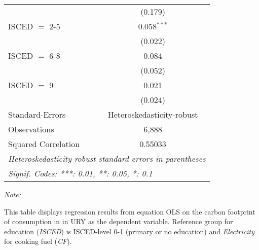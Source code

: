 \begin{table}[htbp!]
\begin{adjustbox}{width = 1\textwidth, max height = 0.95\textheight, center}
\begin{threeparttable}[b]
\begin{tabular}{lc}
                                & (0.179)\\   
            ISCED $=$ 2-5       & 0.058$^{***}$\\   
                                & (0.022)\\   
            ISCED $=$ 6-8       & 0.084\\   
                                & (0.052)\\   
            ISCED $=$ 9         & 0.021\\   
                                & (0.024)\\   
            \midrule 
            Standard-Errors     & Heteroskedasticity-robust \\   
            Observations        & 6,888\\  
            Squared Correlation & 0.55033\\  
            \midrule \midrule
            \multicolumn{2}{l}{\emph{Heteroskedasticity-robust standard-errors in parentheses}}\\
            \multicolumn{2}{l}{\emph{Signif. Codes: ***: 0.01, **: 0.05, *: 0.1}}\\
         \end{tabular}
         
         \begin{tablenotes}\item \medskip \textit{Note:}
            \item This table displays regression results from equation OLS on the carbon footprint of consumption in  in URY as the dependent variable.  Reference group for education (\textit{ISCED}) is ISCED-level 0-1 (primary or no education) and \textit{Electricity} for cooking fuel (\textit{CF}).
         \end{tablenotes}
      \end{threeparttable}
   \end{adjustbox}
\end{table}


